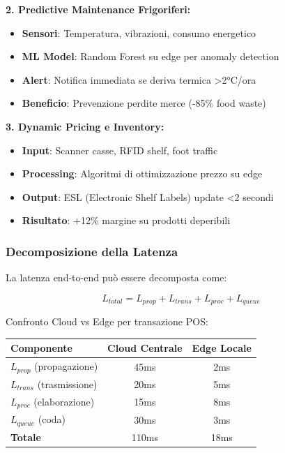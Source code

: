 \textbf{2. Predictive Maintenance Frigoriferi:}
\begin{itemize}
    \item \textbf{Sensori}: Temperatura, vibrazioni, consumo energetico
    \item \textbf{ML Model}: Random Forest su edge per anomaly detection
    \item \textbf{Alert}: Notifica immediata se deriva termica >2°C/ora
    \item \textbf{Beneficio}: Prevenzione perdite merce (-85\% food waste)
\end{itemize}

\textbf{3. Dynamic Pricing e Inventory:}
\begin{itemize}
    \item \textbf{Input}: Scanner casse, RFID shelf, foot traffic
    \item \textbf{Processing}: Algoritmi di ottimizzazione prezzo su edge
    \item \textbf{Output}: ESL (Electronic Shelf Labels) update <2 secondi
    \item \textbf{Risultato}: +12\% margine su prodotti deperibili
\end{itemize}

\subsubsection{\texorpdfstring{\textbf{Decomposizione della Latenza}}{3.3.2.5 - Decomposizione della Latenza}}

La latenza end-to-end può essere decomposta come:

\begin{equation}
L_{total} = L_{prop} + L_{trans} + L_{proc} + L_{queue}
\end{equation}

Confronto Cloud vs Edge per transazione POS:

\begin{tabular}{lcc}
\toprule
\textbf{Componente} & \textbf{Cloud Centrale} & \textbf{Edge Locale} \\
\midrule
$L_{prop}$ (propagazione) & 45ms & 2ms \\
$L_{trans}$ (trasmissione) & 20ms & 5ms \\
$L_{proc}$ (elaborazione) & 15ms & 8ms \\
$L_{queue}$ (coda) & 30ms & 3ms \\
\midrule
\textbf{Totale} & 110ms & 18ms \\
\bottomrule
\end{tabular}


